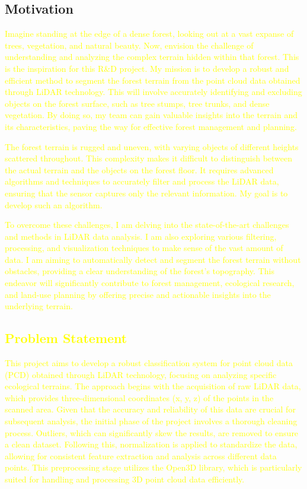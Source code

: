 \documentclass[../report.tex]{subfiles}
\begin{document}
    \subsection{Motivation}
    \label{sec:introduction:motivation}
\textcolor{yellow}{Imagine standing at the edge of a dense forest, looking out at a vast expanse of trees, vegetation, and natural beauty. Now, envision the challenge of understanding and analyzing the complex terrain hidden within that forest. This is the inspiration for this R\&D project. My mission is to develop a robust and efficient method to segment the forest terrain from the point cloud data obtained through LiDAR technology. This will involve accurately identifying and excluding objects on the forest surface, such as tree stumps, tree trunks, and dense vegetation. By doing so, my team can gain valuable insights into the terrain and its characteristics, paving the way for effective forest management and planning.

\textcolor{yellow}{The forest terrain is rugged and uneven, with varying objects of different heights scattered throughout. This complexity makes it difficult to distinguish between the actual terrain and the objects on the forest floor. It requires advanced algorithms and techniques to accurately filter and process the LiDAR data, ensuring that the sensor captures only the relevant information. My goal is to develop such an algorithm.}

\textcolor{yellow}{To overcome these challenges, I am delving into the state-of-the-art challenges and methods in LiDAR data analysis. I am also exploring various filtering, processing, and visualization techniques to make sense of the vast amount of data. I am aiming to automatically detect and segment the forest terrain without obstacles, providing a clear understanding of the forest's topography. This endeavor will significantly contribute to forest management, ecological research, and land-use planning by offering precise and actionable insights into the underlying terrain.
    }
    
    \subsection{Problem Statement}
    \label{sec:introduction:problem_statement}
\textcolor{yellow}{This project aims to develop a robust classification system for point cloud data (PCD) obtained through LiDAR technology, focusing on analyzing specific ecological terrains. The approach begins with the acquisition of raw LiDAR data, which provides three-dimensional coordinates (x, y, z) of the points in the scanned area. Given that the accuracy and reliability of this data are crucial for subsequent analysis, the initial phase of the project involves a thorough cleaning process. Outliers, which can significantly skew the results, are removed to ensure a clean dataset. Following this, normalization is applied to standardize the data, allowing for consistent feature extraction and analysis across different data points. This preprocessing stage utilizes the Open3D library, which is particularly suited for handling and processing 3D point cloud data efficiently.}

}
\end{document}
